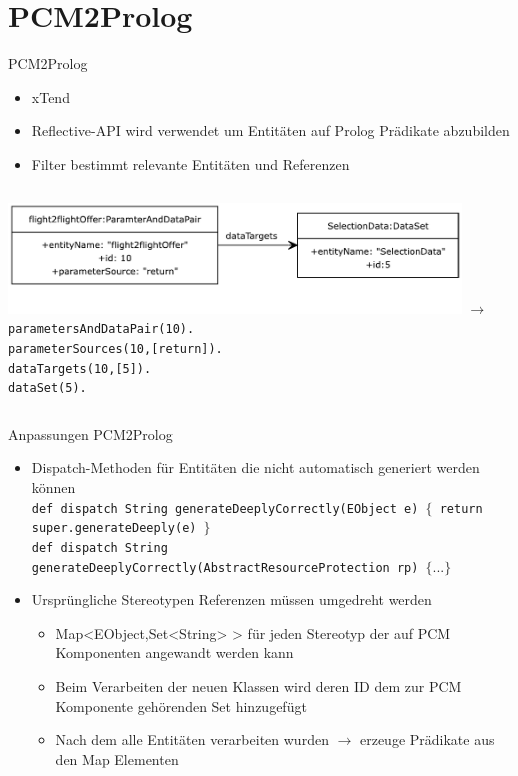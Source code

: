 \documentclass{sdqbeamer}
\begin{document}
\section{PCM2Prolog}
\begin{frame}{PCM2Prolog}
	\begin{itemize}
		\item xTend
		\item Reflective-API wird verwendet um Entitäten auf Prolog Prädikate abzubilden
		\item Filter bestimmt relevante Entitäten und Referenzen
	\end{itemize}
\vspace{0.05\textheight}
	\begin{columns}
		\centering
		\includegraphics[width=0.9\textwidth]{images/pcm2prologUml.pdf}
		\centering
		$\rightarrow$
		\texttt{parametersAndDataPair(10).\\
			parameterSources(10,[return]).\\
			dataTargets(10,[5]).\\ \vspace{0.05\textheight}
			dataSet(5).}
	\end{columns}
\end{frame}	
\begin{frame}{Anpassungen PCM2Prolog}
	\begin{itemize}
		\item Dispatch-Methoden für Entitäten die nicht automatisch generiert werden können \\ \vspace{0.05\textheight}
		\texttt{def dispatch String generateDeeplyCorrectly(EObject e) $\{$
				return super.generateDeeply(e)
		$\}$}\\
		\texttt{def dispatch String generateDeeplyCorrectly(AbstractResourceProtection rp) $\{...\}$} \\ \vspace{0.05\textheight}
		\item Ursprüngliche Stereotypen Referenzen müssen umgedreht werden
		\begin{itemize}
			\item Map<EObject,Set<String> > für jeden Stereotyp der auf PCM Komponenten angewandt werden kann
			\item Beim Verarbeiten der neuen Klassen wird deren ID dem zur PCM Komponente gehörenden Set hinzugefügt
			\item Nach dem alle Entitäten verarbeiten wurden $\rightarrow$ erzeuge Prädikate aus den Map Elementen
		\end{itemize}
	\end{itemize}
\end{frame}
\end{document}

